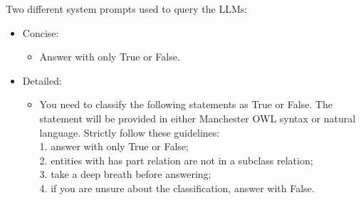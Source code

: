 \documentclass[handout]{beamer}\mode<handout>{\usetheme{AMSBolognaFC}}
\begin{document}
\begin{frame}[c,allowframebreaks]
    Two different system prompts used to query the LLMs:
    \begin{itemize}
        \item Concise:
        \begin{itemize}
            \item Answer with only True or False.
        \end{itemize}
        \item Detailed:
        \begin{itemize}
            \item You need to classify the following statements as True or False.
            The statement will be provided in either Manchester OWL syntax or natural language.
            Strictly follow these guidelines:\\
            1. answer with only True or False;\\
            2. entities with has part relation are not in a subclass relation;\\
            3. take a deep breath before answering;\\
            4. if you are unsure about the classification, answer with False.
        \end{itemize}
    \end{itemize}

\end{frame}

\end{document}
